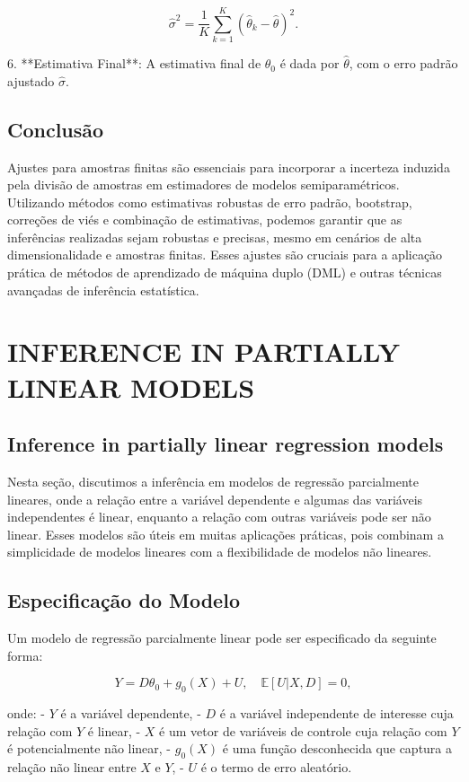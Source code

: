 \documentclass[a4paper,12pt]{article}[abntex2]
\begin{document}
\[
\hat{\sigma}^2 = \frac{1}{K} \sum_{k=1}^K (\hat{\theta}_k - \hat{\theta})^2.
\]

6. **Estimativa Final**: A estimativa final de $\theta_0$ é dada por $\hat{\theta}$, com o erro padrão ajustado $\hat{\sigma}$.

\subsection*{Conclusão}

Ajustes para amostras finitas são essenciais para incorporar a incerteza induzida pela divisão de amostras em estimadores de modelos semiparamétricos. Utilizando métodos como estimativas robustas de erro padrão, bootstrap, correções de viés e combinação de estimativas, podemos garantir que as inferências realizadas sejam robustas e precisas, mesmo em cenários de alta dimensionalidade e amostras finitas. Esses ajustes são cruciais para a aplicação prática de métodos de aprendizado de máquina duplo (DML) e outras técnicas avançadas de inferência estatística.

\newpage

\section{INFERENCE IN PARTIALLY LINEAR MODELS}

\subsection{Inference in partially linear regression models}

Nesta seção, discutimos a inferência em modelos de regressão parcialmente lineares, onde a relação entre a variável dependente e algumas das variáveis independentes é linear, enquanto a relação com outras variáveis pode ser não linear. Esses modelos são úteis em muitas aplicações práticas, pois combinam a simplicidade de modelos lineares com a flexibilidade de modelos não lineares.

\subsection*{Especificação do Modelo}

Um modelo de regressão parcialmente linear pode ser especificado da seguinte forma:

\[
Y = D\theta_0 + g_0(X) + U, \quad \mathbb{E}[U | X,D] = 0,
\]

onde:
- $Y$ é a variável dependente,
- $D$ é a variável independente de interesse cuja relação com $Y$ é linear,
- $X$ é um vetor de variáveis de controle cuja relação com $Y$ é potencialmente não linear,
- $g_0(X)$ é uma função desconhecida que captura a relação não linear entre $X$ e $Y$,
- $U$ é o termo de erro aleatório.
\end{document}
